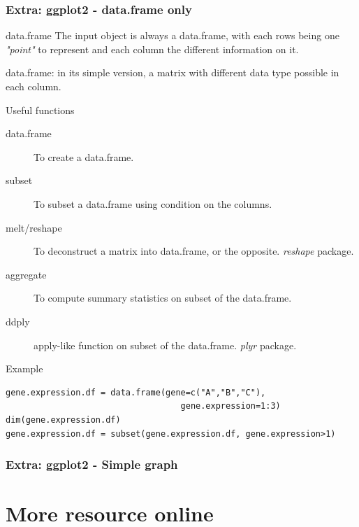 \documentclass[10pt]{beamer}
\newenvironment{xframe}[2][]
  {\begin{frame}[fragile,environment=xframe,#1]
  \frametitle{#2}}
  {\end{frame}}
\begin{document}
\begin{xframe}[shrink=10]{Extra: {\sf ggplot2} - {\sf data.frame} only}
    \begin{block}{{\sf data.frame}}
    The input object is always a {\sf data.frame}, with each rows being one {\it "point"} to represent and each column the different information on it.
    \medskip
    
    {\small {\sf data.frame}: in its simple version, a {\sf matrix} with different data type possible in each column.}
  \end{block}

  \begin{block}{Useful functions}
    \begin{description}
    \item[data.frame] To create a {\sf data.frame}.
    \item[subset] To subset a {\sf data.frame} using condition on the columns.
    \item[melt/reshape] To deconstruct a matrix into data.frame, or the opposite. {\it reshape} package.
    \item[aggregate] To compute summary statistics on subset of the data.frame.
    \item[ddply] {\sf apply}-like function on subset of the data.frame. {\it plyr} package.
    \end{description}
  \end{block}
  \begin{exampleblock}{Example}
\begin{verbatim}
gene.expression.df = data.frame(gene=c("A","B","C"),
                                   gene.expression=1:3)
dim(gene.expression.df)
gene.expression.df = subset(gene.expression.df, gene.expression>1)
\end{verbatim}  
  \end{exampleblock}
\end{xframe}

\begin{xframe}{Extra: {\sf ggplot2} - Simple graph}
  \begin{block}{}
    
  \end{block}
\end{xframe}

\section{More resource online}
\end{document}
